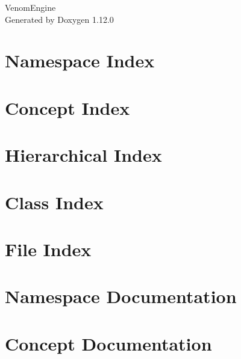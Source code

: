 \documentclass[twoside]{book}
\newcommand{\+}{\discretionary{\mbox{\scriptsize$\hookleftarrow$}}{}{}}
\newcommand{\clearemptydoublepage}{%
    \newpage{\pagestyle{empty}\cleardoublepage}%
  }
\begin{document}
  \raggedbottom
    \hypersetup{pageanchor=false,
                bookmarksnumbered=true,
                pdfencoding=unicode
               }
  \begin{titlepage}
  \vspace*{7cm}
  \begin{center}%
  {\Large Venom\+Engine}\\
  \vspace*{1cm}
  {\large Generated by Doxygen 1.12.0}\\
  \end{center}
  \end{titlepage}
  \clearemptydoublepage
  \tableofcontents
  \clearemptydoublepage
  \hypersetup{pageanchor=true}



\chapter{Namespace Index}

\chapter{Concept Index}

\chapter{Hierarchical Index}

\chapter{Class Index}

\chapter{File Index}

\chapter{Namespace Documentation}



\chapter{Concept Documentation}


\end{document}
